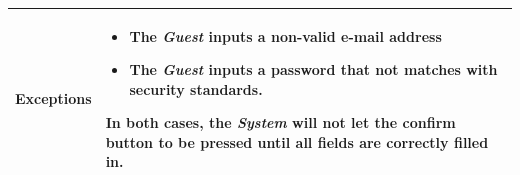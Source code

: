 \begin{table}[H]
\begin{tabular}{|l|p{}|}
\textbf{Exceptions} &    \begin{itemize}
    \item The \textit{Guest} inputs a non-valid e-mail address
    \item The \textit{Guest} inputs a password that not matches with security standards. 
    \end{itemize} 
  In both cases, the \textit{System} will not let the confirm button to be pressed until all fields are correctly filled in.
                                                                            \\ \hline
\end{tabular}
\end{table}








